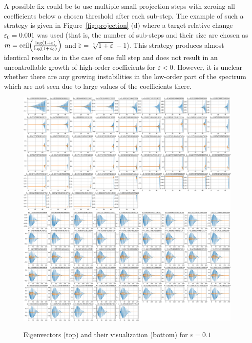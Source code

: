 \documentclass{article}
\newcommand{\of}[1]{\mleft( #1 \mright)}
\begin{document}
A possible fix could be to use multiple small projection steps with zeroing all coefficients below a chosen threshold after each sub-step. The example of such a strategy is given in  Figure~\ref{fig:projection} (d) where a target relative change $\varepsilon_0 = 0.001$ was used (that is, the number of sub-steps and their size are chosen as $m = \text{ceil}\of{\frac{\log\of{1+\varepsilon}}{\log\of{1+\varepsilon_0}}}$ and $\tilde{\varepsilon} = \sqrt[n]{1+\varepsilon} - 1$). This strategy produces almost identical results as in the case of one full step and does not result in an uncontrollable growth of high-order coefficients for $\varepsilon < 0$. However, it is unclear whether there are any growing instabilities in the low-order part of the spectrum which are not seen due to large values of the coefficients there.


\begin{figure}[H]
\centering
\includegraphics[width=1.2\textwidth]{dat/projection_pos_eigs.png}
\includegraphics[width=1.2\textwidth]{dat/projection_pos_eigs_visual.png}
\caption{Eigenvectors (top) and their visualization (bottom) for $\varepsilon = 0.1$}
\end{figure}
\end{document}
